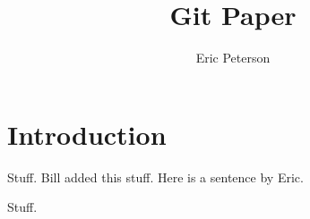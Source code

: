 \documentclass[12pt]{article}
\author{Eric Peterson} \title{Git Paper}
\begin{document}
\maketitle
\section{Introduction}

Stuff.
Bill added this stuff.
Here is a sentence by Eric.

Stuff.
\end{document}
